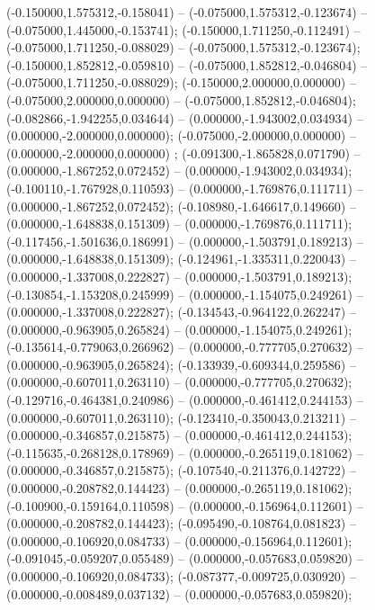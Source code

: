  (-0.150000,1.575312,-0.158041) -- (-0.075000,1.575312,-0.123674) -- (-0.075000,1.445000,-0.153741);
 (-0.150000,1.711250,-0.112491) -- (-0.075000,1.711250,-0.088029) -- (-0.075000,1.575312,-0.123674);
 (-0.150000,1.852812,-0.059810) -- (-0.075000,1.852812,-0.046804) -- (-0.075000,1.711250,-0.088029);
 (-0.150000,2.000000,0.000000) -- (-0.075000,2.000000,0.000000) -- (-0.075000,1.852812,-0.046804);
 (-0.082866,-1.942255,0.034644) -- (0.000000,-1.943002,0.034934) -- (0.000000,-2.000000,0.000000);
 (-0.075000,-2.000000,0.000000) -- (0.000000,-2.000000,0.000000) ;
 (-0.091300,-1.865828,0.071790) -- (0.000000,-1.867252,0.072452) -- (0.000000,-1.943002,0.034934);
 (-0.100110,-1.767928,0.110593) -- (0.000000,-1.769876,0.111711) -- (0.000000,-1.867252,0.072452);
 (-0.108980,-1.646617,0.149660) -- (0.000000,-1.648838,0.151309) -- (0.000000,-1.769876,0.111711);
 (-0.117456,-1.501636,0.186991) -- (0.000000,-1.503791,0.189213) -- (0.000000,-1.648838,0.151309);
 (-0.124961,-1.335311,0.220043) -- (0.000000,-1.337008,0.222827) -- (0.000000,-1.503791,0.189213);
 (-0.130854,-1.153208,0.245999) -- (0.000000,-1.154075,0.249261) -- (0.000000,-1.337008,0.222827);
 (-0.134543,-0.964122,0.262247) -- (0.000000,-0.963905,0.265824) -- (0.000000,-1.154075,0.249261);
 (-0.135614,-0.779063,0.266962) -- (0.000000,-0.777705,0.270632) -- (0.000000,-0.963905,0.265824);
 (-0.133939,-0.609344,0.259586) -- (0.000000,-0.607011,0.263110) -- (0.000000,-0.777705,0.270632);
 (-0.129716,-0.464381,0.240986) -- (0.000000,-0.461412,0.244153) -- (0.000000,-0.607011,0.263110);
 (-0.123410,-0.350043,0.213211) -- (0.000000,-0.346857,0.215875) -- (0.000000,-0.461412,0.244153);
 (-0.115635,-0.268128,0.178969) -- (0.000000,-0.265119,0.181062) -- (0.000000,-0.346857,0.215875);
 (-0.107540,-0.211376,0.142722) -- (0.000000,-0.208782,0.144423) -- (0.000000,-0.265119,0.181062);
 (-0.100900,-0.159164,0.110598) -- (0.000000,-0.156964,0.112601) -- (0.000000,-0.208782,0.144423);
 (-0.095490,-0.108764,0.081823) -- (0.000000,-0.106920,0.084733) -- (0.000000,-0.156964,0.112601);
 (-0.091045,-0.059207,0.055489) -- (0.000000,-0.057683,0.059820) -- (0.000000,-0.106920,0.084733);
 (-0.087377,-0.009725,0.030920) -- (0.000000,-0.008489,0.037132) -- (0.000000,-0.057683,0.059820);

